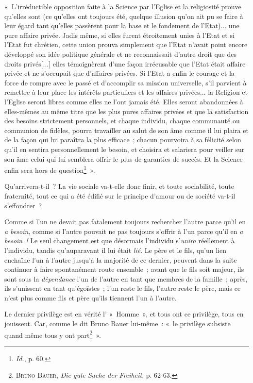 \documentclass[french,twoside]{book} %
\newcommand\corr[1]{#1}
\begin{document}
« L’irréductible opposition faite à la Science par l’Eglise et la religiosité prouve qu’elles sont (ce qu’elles ont toujours été, quelque illusion qu’on ait pu se faire à leur égard tant qu’elles passèrent pour la base et le fondement de l’Etat)... une pure affaire privée. Jadis même, si elles furent étroitement unies à l’Etat et si l’Etat fut chrétien, cette union prouva simplement que l’Etat n’avait point encore développé son idée politique générale et ne reconnaissait d’autre droit que des droits privés[{\corr ...}] elles témoignèrent d’une façon irrécusable que l’Etat était affaire privée et ne s’occupait que d’affaires privées. Si l’Etat a enfin le courage et la force de rompre avec le passé et d’accomplir sa mission universelle, s’il parvient à remettre à leur place les intérêts particuliers et les affaires privées... la Religion et l’Eglise seront libres comme elles ne l’ont jamais été. Elles seront abandonnées à elles-mêmes au même titre que les plus pures affaires privées et que la satisfaction des besoins strictement personnels, et chaque individu, chaque communauté ou communion de fidèles, pourra travailler au salut de son âme comme il lui plaira et de la façon qui lui paraîtra la plus efficace ; chacun pourvoira à sa félicité selon qu’il en sentira personnellement le besoin, et choisira et salariera pour veiller sur son âme celui qui lui semblera offrir le plus de garanties de succès. Et la Science enfin sera hors de question\footnote{ \noindent \emph{Id.}, p. 60.
 } ».\par
Qu’arrivera-t-il ? La vie sociale va-t-elle donc finir, et toute sociabilité, toute fraternité, tout ce qui a été édifié sur le principe d’amour ou de société va-t-il s’effondrer ?\par
 Comme si l’un ne devait pas fatalement toujours rechercher l’autre parce qu’il en \emph{a besoin}, comme si l’autre pouvait ne pas toujours s’offrir à l’un parce qu’il en \emph{a besoin !} Le seul changement est que désormais l’individu s’\emph{unira} réellement à l’individu, tandis qu’auparavant il lui était \emph{lié}. Le père et le fils, qu’un lien enchaîne l’un à l’autre jusqu’à la majorité de ce dernier, peuvent dans la suite continuer à faire spontanément route ensemble ; avant que le fils soit majeur, ils sont sous la \emph{dépendance} l’un de l’autre en tant que membres de la famille ; après, ils s’unissent en tant qu’égoïstes ; l’un reste le fils, l’autre reste le père, mais ce n’est plus comme fils et père qu’ils tiennent l’un à l’autre.\par
Le dernier privilège est en vérité l’ « Homme », et tous ont ce privilège, tous en jouissent. Car, comme le dit Bruno Bauer lui-même : « le privilège subsiste quand même tous y ont part\footnote{ \noindent B{\scshape runo} B{\scshape auer}, \emph{Die gute Sache der Freiheit}, p. 62-63.
 } ».\par
\end{document}
